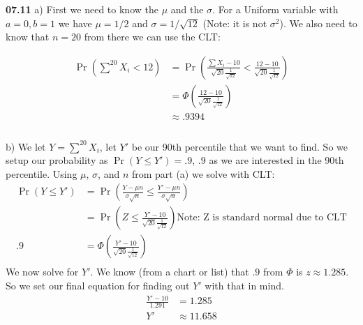 {\bf 07.11} \quad  
a) First we need to know the $\mu$ and the $\sigma$. For a Uniform variable with $a = 0, b = 1$ we have
$\mu = 1/2$ and $\sigma = 1/\sqrt{12}$ (Note: it is not $\sigma^2$). We also need to know that $n = 20$ 
from there we can use the CLT: 


\begin{equation*}
\begin{split}
	\Pr\left( \sum^{20} X_{i} < 12\right)  & = \Pr\left(\frac{\sum X_{i} - 10}{\sqrt{20} \frac{1}{\sqrt{12}}} < \frac{12 - 10}{\sqrt{20} \frac{1}{\sqrt{12}}}\right) \\
		& = \Phi \left( \frac{12 - 10}{\sqrt{20} \frac{1}{\sqrt{12}}}\right) \\
		& \approx .9394 \\
\end{split}
\end{equation*}
\\
b) We let $Y = \sum^{20} X_{i}$, let $Y'$ be our 90th percentile that we want to find. So we setup our probability as $\Pr (Y \leq Y') = .9$, $.9$ as we are interested in the 90th percentile. Using $\mu$, $\sigma$, and $n$ from part (a) we solve with CLT: \\
\begin{equation*}
\begin{split}
	\Pr\left( Y \leq Y' \right) & =
	\Pr\left( \frac{Y - \mu n}{\sigma \sqrt{n}} \leq \frac{Y' - \mu n}{\sigma \sqrt{n}} \right) \\
	& = \Pr \left( Z \leq \frac{Y' - 10}{\sqrt{20} \frac{1}{\sqrt{12}}}\right) \text{Note: Z is standard normal due to CLT} \\
	.9 &=	\Phi \left( \frac{Y' - 10}{\sqrt{20} \frac{1}{\sqrt{12}}}\right) \\
\end{split}
\end{equation*}
We now solve for $Y'$. We know (from a chart or list) that $.9$ from $\Phi$ is $z \approx 1.285$.
So we set our final equation for finding out $Y'$ with that in mind.
\begin{equation*}
\begin{split}
	\frac{Y' - 10}{1.291} & = 1.285 \\
	Y'  & \approx 11.658\\
\end{split}
\end{equation*}
